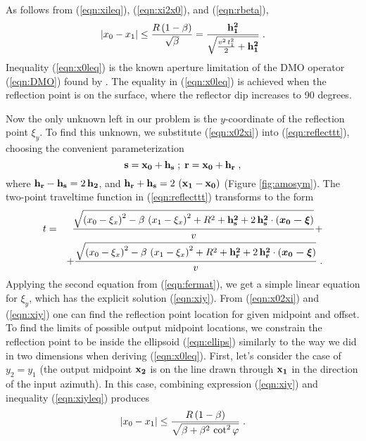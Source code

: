 As follows from (\ref{eqn:xileq}), (\ref{eqn:xi2x0}), and (\ref{eqn:rbeta}),
\begin{equation}
\left|x_0-x_1\right| \leq {R\,(1-\beta)\over \sqrt{\beta}}=
{{\bf h_1^2}\over \sqrt{{{v^2\,t_1^2}\over 2}+{\bf h_1^2}}}\;.
\label{eqn:x0leq}
\end{equation}
Inequality (\ref{eqn:x0leq}) is the known aperture limitation of the
DMO operator (\ref{eqn:DMO}) found by \cite{GPR29-03-03740406}. The
equality in (\ref{eqn:x0leq}) is achieved when the reflection point is
on the surface, where the reflector dip increases to 90 degrees.
\par
Now the only unknown left in our problem is the $y$-coordinate of the
reflection point $\xi_y$. To find this unknown, we substitute
(\ref{eqn:x02xi}) into (\ref{eqn:reflecttt}), choosing the convenient
parameterization
\begin{equation}
{\bf s  =  x_0+ h_s\;;\; r  =   x_0+ h_r}\;, 
\label{eqn:x02sr}
\end{equation}
where ${\bf h_r-h_s}=2\,{\bf h_2}$, and ${\bf h_r+h_s}=2\ {\bf
\left(x_1-x_0\right)}$ (Figure \ref{fig:amosym}). The 
two-point traveltime function in (\ref{eqn:reflecttt}) transforms to the form
\begin{eqnarray}
t & = & {\sqrt{\left(x_0-\xi_x\right)^2-\beta\,\left(x_1-\xi_x\right)^2+R^2+
{\bf h_s^2}+2\,{\bf h_s^2}\cdot\left(\mbox{\boldmath{$x_0-\xi$}}\right)}
\over v}+
\nonumber \\
& & + {\sqrt{\left(x_0-\xi_x\right)^2-\beta\,\left(x_1-\xi_x\right)^2+R^2+
{\bf h_r^2}+2\,{\bf h_r^2}\cdot\left(\mbox{\boldmath{$x_0-\xi$}}\right)}
\over v}\;.
\label{eqn:reflectrt}
\end{eqnarray} 
Applying the second equation from (\ref{eqn:fermat}), we get a simple linear
equation for $\xi_y$, which has the explicit solution (\ref{eqn:xiy}).
From (\ref{eqn:x02xi}) and (\ref{eqn:xiy}) one can find the reflection
point location for given midpoint and offset. To find the limits of
possible output midpoint locations, we constrain the reflection
point to be inside the ellipsoid (\ref{eqn:ellips}) similarly to the way we did
in two dimensions when deriving (\ref{eqn:x0leq}). First, let's consider the
case of $y_2=y_1$ (the output midpoint ${\bf x_2}$ is on the line drawn
through ${\bf x_1}$ in the direction of the input azimuth). In this
case, combining expression (\ref{eqn:xiy}) and inequality (\ref{eqn:xiyleq})
produces
\begin{equation}
\left|x_0-x_1\right| \leq {R\,(1-\beta)\over 
\sqrt{\beta+\beta^2\,\cot^2{\varphi}}}\;.
\label{eqn:x0leq3D}
\end{equation}
